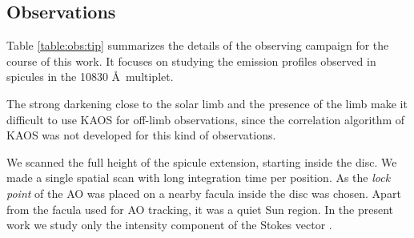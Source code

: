 \subsection{Observations\label{obs:tip}}

Table \ref{table:obs:tip} summarizes the details of the observing campaign for the course of this work. It focuses on studying the emission profiles observed in spicules in the  10830 \AA\  multiplet. 

The strong darkening close to the solar limb and the presence of the
limb make it difficult to use KAOS for off-limb observations, since the
correlation algorithm of KAOS was not developed for this kind of observations. 

We scanned the full height of the spicule extension, starting inside the disc. We made a single spatial scan with long integration time per position. As the \emph{lock point} of the AO was placed on a nearby facula inside the disc was chosen. Apart from the facula used for AO tracking, it was a quiet Sun region. In the present work we study only the intensity component of the Stokes vector \citep[see definition in e.g.][]{Chandrasekhar:1960lr,wikistokes}.


